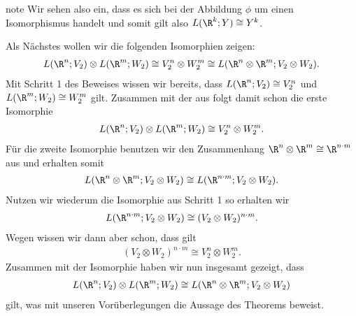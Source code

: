 \documentclass[letterpaper,10pt,german]{jupyterBook}
\begin{document}
\begin{sphinxadmonition}{note}
\sphinxAtStartPar
Wir sehen also ein, dass es sich bei der Abbildung \(\phi\) um einen Isomorphismus handelt und somit gilt also \(L(\R^k; Y) \cong Y^k\).

\sphinxAtStartPar
{} Als Nächstes wollen wir die folgenden Isomorphien zeigen:
\begin{equation*}
\begin{split}L(\R^n; V_2) \otimes L(\R^m; W_2) \cong V_2^n \otimes W_2^m\cong L(\R^n\otimes \R^m; V_2\otimes W_2).\end{split}
\end{equation*}
\sphinxAtStartPar
Mit Schritt 1 des Beweises wissen wir bereits, dass \(L(\R^n; V_2)\cong V_2^n\) und \(L(\R^m; W_2)\cong W_2^m\) gilt.
Zusammen mit der  aus {\hyperref[\detokenize{vektoranalysis/tensor:lem:natISO}]{}} folgt damit schon die erste Isomorphie
\begin{equation}\label{equation:vektoranalysis/tensor:eq:ersteIsormorphie}
\begin{split}L(\R^n; V_2) \otimes L(\R^m; W_2) \cong V_2^n \otimes W_2^m.\end{split}
\end{equation}
\sphinxAtStartPar
Für die zweite Isomorphie benutzen wir den Zusammenhang \(\R^n\otimes \R^m \cong \R^{n\cdot m}\) aus {\hyperref[\detokenize{vektoranalysis/tensor:cor:isomorphieEndlichDimensional}]{}} und erhalten somit
\begin{equation*}
\begin{split}L(\R^n\otimes \R^m; V_2\otimes W_2) \cong L(\R^{n\cdot m}; V_2\otimes W_2).\end{split}
\end{equation*}
\sphinxAtStartPar
Nutzen wir wiederum die Isomorphie aus Schritt 1 so erhalten wir
\begin{equation*}
\begin{split}L(\R^{n\cdot m}; V_2\otimes W_2) \cong (V_2 \otimes W_2)^{n\cdot m}.\end{split}
\end{equation*}
\sphinxAtStartPar
Wegen {\hyperref[\detokenize{vektoranalysis/tensor:lem:isomorphieKartesischesProdukt}]{}} wissen wir dann aber schon, dass gilt
\begin{equation*}
\begin{split}(V_2 \otimes W_2)^{n\cdot m} \cong V_2^n \otimes W_2^m.\end{split}
\end{equation*}
\sphinxAtStartPar
Zusammen mit der Isomorphie {\hyperref[\detokenize{vektoranalysis/tensor:equation-eq-ersteisormorphie}]{}} haben wir nun insgesamt gezeigt, dass
\begin{equation*}
\begin{split}L(\R^n; V_2) \otimes L(\R^m; W_2) \cong L(\R^n\otimes \R^m; V_2\otimes W_2)\end{split}
\end{equation*}
\sphinxAtStartPar
gilt, was mit unseren Vorüberlegungen die Aussage des Theorems beweist.
\end{sphinxadmonition}
\end{document}
